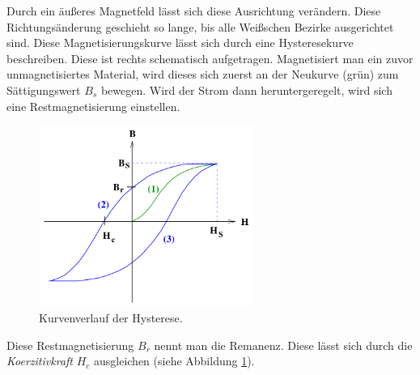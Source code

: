 Durch ein äußeres Magnetfeld lässt sich diese Ausrichtung verändern.
Diese Richtungsänderung geschieht so lange, bis alle Weißschen Bezirke ausgerichtet sind.
Diese Magnetisierungskurve lässt sich durch eine Hysteresekurve beschreiben.
Diese ist rechts schematisch aufgetragen.
Magnetisiert man ein zuvor unmagnetisiertes Material, wird dieses sich zuerst an der Neukurve (grün) zum Sättigungswert $B_{s}$ bewegen.
Wird der Strom dann heruntergeregelt, wird sich eine Restmagnetisierung einstellen.

\begin{figure} 
    \centering
    \includegraphics[width=7cm] {pictures/Hysteresekurve.png}  
    \caption{Kurvenverlauf der Hysterese. \cite{v308}}
    \label{fig:Hysteresekurve}
\end{figure} 

Diese Restmagnetisierung $B_{r}$ nennt man die Remanenz.
Diese lässt sich durch die \textit{Koerzitivkraft} $H_{c}$ ausgleichen (siehe Abbildung \ref{fig:Hysteresekurve}).